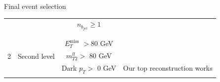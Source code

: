 \documentclass[handout,8 pt]{beamer}
\begin{document}
\begin{frame}{Final event selection}
\begin{minipage}[c]{.97\linewidth}
\begin{center}
{\begin{tabular}{c|c|c|c}
	  & & $n_{b_{jet}} \geq 1$ & \\
	  & & & \\
	  \hline
	  & & & \\
	  \multirow{3}{*}{2} & \multirow{3}{*}{Second level} & $E_T^{\text{miss}}$ $> 80$ GeV &  \\
	  & & $m_{T2}^{ll} >$ 80 GeV &  \\
	  & &  Dark $p_T>$ 0 GeV & Our top reconstruction works \\
	  & & & \\
   \end{tabular}
   } 
   \end{center}
   \end{minipage} \hfill

\end{frame}




\end{document}
